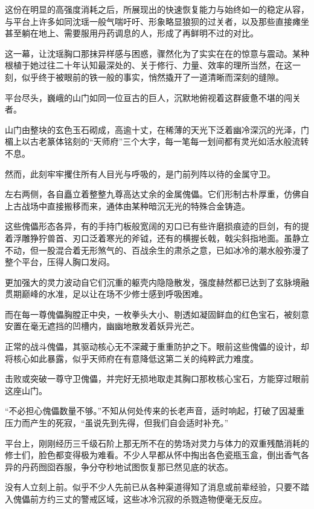 这份在明显的高强度消耗之后，所展现出的快速恢复能力与始终如一的稳定从容，与平台上许多如同沈瑶一般气喘吁吁、形象略显狼狈的过关者，以及那些直接瘫坐甚至躺在地上、需要服用丹药调息的人，形成了再鲜明不过的对比。

这一幕，让沈瑶胸口那抹异样感与困惑，骤然化为了实实在在的惊意与震动。某种根植于她过往二十年认知最深处的、关于修行、力量、效率的理所当然，在这一刻，似乎终于被眼前的铁一般的事实，悄然撬开了一道清晰而深刻的缝隙。

\vspace{2em}

平台尽头，巍峨的山门如同一位亘古的巨人，沉默地俯视着这群疲惫不堪的闯关者。

山门由整块的玄色玉石砌成，高逾十丈，在稀薄的天光下泛着幽冷深沉的光泽，门楣上以古老篆体铭刻的“天师府”三个大字，每一笔每一划间都有灵光如活水般流转不息。

然而，此刻牢牢攫住所有人目光与呼吸的，是门前列阵以待的金属守卫。

左右两侧，各自矗立着整整九尊高达丈余的金属傀儡。它们形制古朴厚重，仿佛自上古战场中直接搬移而来，通体由某种暗沉无光的特殊合金铸造。

这些傀儡形态各异，有的手持门板般宽阔的刃口已有些许磨损痕迹的巨剑，有的提着浮雕狰狞兽首、刃口泛着寒光的斧钺，还有的横握长戟，戟尖斜指地面。虽静立不动，但一股混合着无形煞气的、百战余生的肃杀之意，已如冰冷的潮水般弥漫了整个平台，压得人胸口发闷。

更加强大的灵力波动自它们沉重的躯壳内隐隐散发，强度赫然都已达到了玄脉境融贯期巅峰的水准，足以让在场不少修士感到呼吸困难。

而在每一尊傀儡胸膛正中央，一枚拳头大小、剔透如凝固鲜血的红色宝石，被刻意安置在毫无遮挡的凹槽内，幽幽地散发着妖异光芒。

正常的战斗傀儡，其驱动核心无不深藏于重重防护之下。眼前这些傀儡的设计，却将核心如此暴露，似乎天师府在有意降低这第二关的纯粹武力难度。

击败或突破一尊守卫傀儡，并完好无损地取走其胸口那枚核心宝石，方能穿过眼前这座山门。

“不必担心傀儡数量不够。”不知从何处传来的长老声音，适时响起，打破了因凝重压力而产生的死寂，“虽说先到先得，但我们自会适时补充。”

平台上，刚刚经历三千级石阶上那无所不在的势场对灵力与体力的双重残酷消耗的修士们，脸色都变得极为难看。不少人早都从怀中掏出各色瓷瓶玉盒，倒出香气各异的丹药囫囵吞服，争分夺秒地试图恢复那已然见底的状态。

没有人立刻上前。似乎不少人先前已从各种渠道得知了消息或前辈经验，只要不踏入傀儡前方约三丈的警戒区域，这些冰冷沉寂的杀戮造物便毫无反应。

